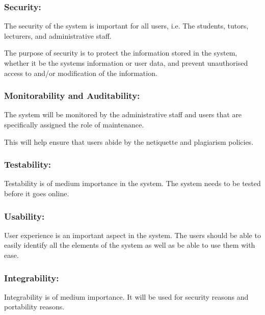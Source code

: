 		\subsubsection{Security:} 
The security of the system is important for all users, i.e. The students, tutors, lecturers, and administrative staff.

The purpose of security is to protect the information stored in the system, whether it be the systems information or user data, and prevent unauthorised access to and/or modification of the information.
\newline
 
	\subsubsection{Monitorability and Auditability:} 
The system will be monitored by the administrative staff and users that are specifically assigned the role of maintenance. 

This will help ensure that users abide by the netiquette and plagiarism policies.  
			
	\subsubsection{Testability:} 
		
	Testability is of medium importance in the system. The system needs to be tested before it goes online. 
		
		
	\subsubsection{Usability:} 
		
		User experience is an important aspect in the system. The users should be able to easily identify all the elements of the system as well as be able to use them with ease.
		

	\subsubsection{Integrability:} 
		
	Integrability is of medium importance. It will be used for security reasons and portability reasons. 

	

